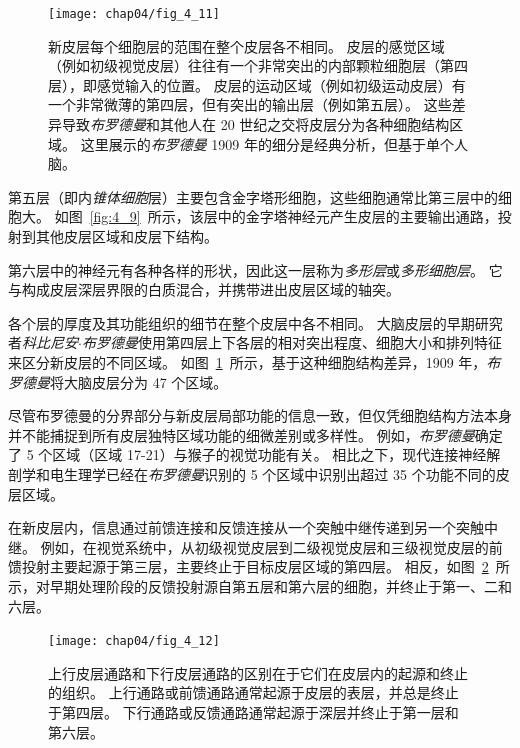 \begin{figure}[htbp]
	\centering
	\texttt{[image: chap04/fig\_4\_11]}
	\caption{新皮层每个细胞层的范围在整个皮层各不相同。
		皮层的感觉区域（例如初级视觉皮层）往往有一个非常突出的内部颗粒细胞层（第四层），即感觉输入的位置。
		皮层的运动区域（例如初级运动皮层）有一个非常微薄的第四层，但有突出的输出层（例如第五层）。
		这些差异导致\textit{布罗德曼}和其他人在 20 世纪之交将皮层分为各种细胞结构区域。
		这里展示的\textit{布罗德曼} 1909 年的细分是经典分析，但基于单个人脑\cite{martin2012neuroanatomy}。}
	\label{fig:4_11}
\end{figure}


第五层（即内\textit{锥体细胞}层）主要包含金字塔形细胞，这些细胞通常比第三层中的细胞大。
如图~\ref{fig:4_9}~所示，该层中的金字塔神经元产生皮层的主要输出通路，投射到其他皮层区域和皮层下结构。


第六层中的神经元有各种各样的形状，因此这一层称为\textit{多形层}或\textit{多形细胞层}。
它与构成皮层深层界限的白质混合，并携带进出皮层区域的轴突。


各个层的厚度及其功能组织的细节在整个皮层中各不相同。 
大脑皮层的早期研究者\textit{科比尼安$\cdot$布罗德曼}使用第四层上下各层的相对突出程度、细胞大小和排列特征来区分新皮层的不同区域。 
如图~\ref{fig:4_11}~所示，基于这种细胞结构差异，1909 年，\textit{布罗德曼}将大脑皮层分为 47 个区域。


尽管布罗德曼的分界部分与新皮层局部功能的信息一致，但仅凭细胞结构方法本身并不能捕捉到所有皮层独特区域功能的细微差别或多样性。
例如，\textit{布罗德曼}确定了 5 个区域（区域 17-21）与猴子的视觉功能有关。
相比之下，现代连接神经解剖学和电生理学已经在\textit{布罗德曼}识别的 5 个区域中识别出超过 35 个功能不同的皮层区域。


在新皮层内，信息通过前馈连接和反馈连接从一个突触中继传递到另一个突触中继。 
例如，在视觉系统中，从初级视觉皮层到二级视觉皮层和三级视觉皮层的前馈投射主要起源于第三层，主要终止于目标皮层区域的第四层。
相反，如图~\ref{fig:4_12}~所示，对早期处理阶段的反馈投射源自第五层和第六层的细胞，并终止于第一、二和六层。

\begin{figure}[htbp]
	\centering
	\texttt{[image: chap04/fig\_4\_12]}
	\caption{上行皮层通路和下行皮层通路的区别在于它们在皮层内的起源和终止的组织。
		上行通路或前馈通路通常起源于皮层的表层，并总是终止于第四层。
		下行通路或反馈通路通常起源于深层并终止于第一层和第六层\cite{felleman1991distributed}。}
	\label{fig:4_12}
\end{figure}


